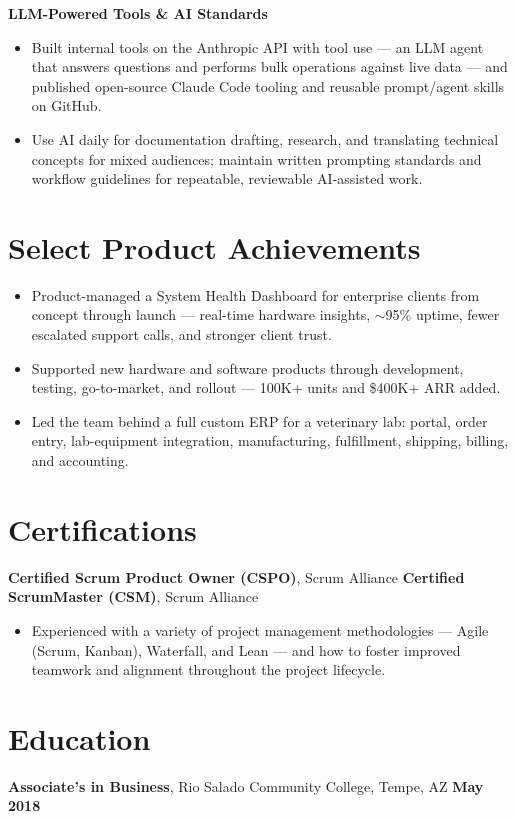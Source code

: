 \documentclass[10pt,letterpaper]{article}
\begin{document}
\textbf{LLM-Powered Tools \& AI Standards}
\begin{itemize}
  \item Built internal tools on the Anthropic API with tool use — an LLM agent that answers questions and performs bulk operations against live data — and published open-source Claude Code tooling and reusable prompt/agent skills on GitHub.
  \item Use AI daily for documentation drafting, research, and translating technical concepts for mixed audiences; maintain written prompting standards and workflow guidelines for repeatable, reviewable AI-assisted work.
\end{itemize}

\section{Select Product Achievements}
\begin{itemize}
  \item Product-managed a System Health Dashboard for enterprise clients from concept through launch — real-time hardware insights, $\sim$95\% uptime, fewer escalated support calls, and stronger client trust.
  \item Supported new hardware and software products through development, testing, go-to-market, and rollout — 100K+ units and \$400K+ ARR added.
  \item Led the team behind a full custom ERP for a veterinary lab: portal, order entry, lab-equipment integration, manufacturing, fulfillment, shipping, billing, and accounting.
\end{itemize}

\section{Certifications}
\textbf{Certified Scrum Product Owner (CSPO)}, Scrum Alliance \quad\textbullet\quad \textbf{Certified ScrumMaster (CSM)}, Scrum Alliance
\begin{itemize}
  \item Experienced with a variety of project management methodologies — Agile (Scrum, Kanban), Waterfall, and Lean — and how to foster improved teamwork and alignment throughout the project lifecycle.
\end{itemize}

\section{Education}
\textbf{Associate's in Business}, Rio Salado Community College, Tempe, AZ \hfill \textbf{May 2018}
\end{document}
